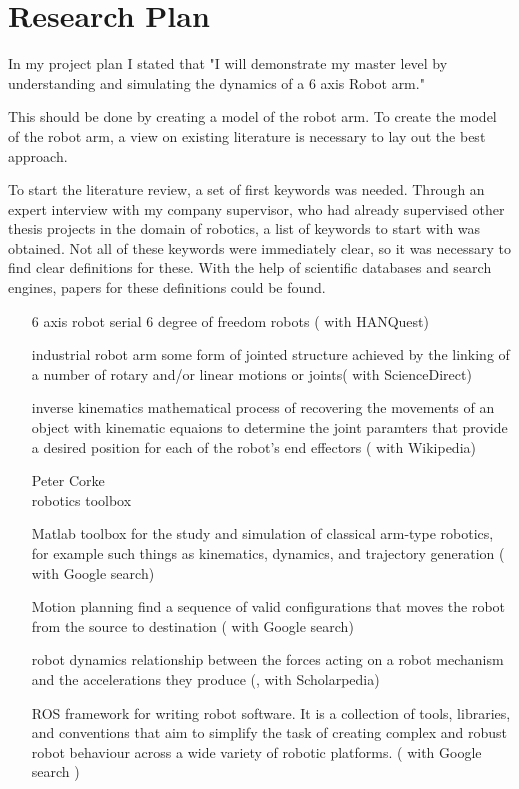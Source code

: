 \chapter{Research Plan}

In my project plan I stated that "I will demonstrate my master level by understanding and simulating the dynamics of a 6 axis Robot arm."\cite{ProjectPlan}

This should be done by creating a model of the robot arm. 
To create the model of the robot arm, a view on existing literature is necessary to lay out the best approach. 

To start the literature review, a set of first keywords was needed. Through an expert interview with my company supervisor, who had already supervised other thesis projects in the domain of robotics, a list of keywords to start with was obtained. Not all of these keywords were immediately clear, so it was necessary to find clear definitions for these. With the help of scientific databases and search engines, papers for these definitions could be found.


	\begin{itemize} [leftmargin=3cm]
	\item [6 axis robot] serial 6 degree of freedom robots (\cite{6axisRobot} with HANQuest)
		\item [industrial robot arm]  some form of jointed structure  achieved by the linking of a number of rotary and/or linear motions or joints( \cite{IndustrialRobotArm} with ScienceDirect)
		\item [inverse kinematics]  mathematical process of recovering the movements of an object with kinematic equaions to determine the joint paramters that provide a desired position for each of the robot's end effectors (\cite{InvKinDef} with Wikipedia)
		\item[{\parbox[t]{0.2\linewidth}{Peter Corke \\ robotics toolbox}}]Matlab toolbox for the study and simulation of classical arm-type robotics, for example such things as kinematics, dynamics, and  trajectory generation (\cite{CorkeRoboticsToolbox} with Google search)
		\item [Motion planning]  find a sequence of valid configurations that moves the robot from the source to destination (\cite{MotionPlanning} with Google search)
		\item [robot dynamics] relationship between the forces acting on a robot mechanism and the accelerations they produce (\cite{RobotDynamics}, with Scholarpedia)
		\item [ROS]  framework for writing robot software. It is a collection of tools, libraries, and conventions that aim to simplify the task of creating complex and robust robot behaviour across a wide variety of robotic platforms. (\cite{ROS} with Google search )
\end{itemize} 



